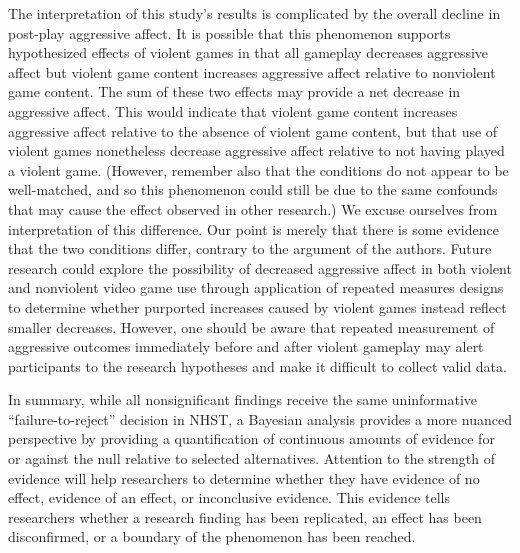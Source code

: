 \documentclass[man]{apa6}
\begin{document}
The interpretation of this study's results is complicated by the overall decline in post-play aggressive affect. It is possible that this phenomenon supports hypothesized effects of violent games in that all gameplay decreases aggressive affect but violent game content increases aggressive affect relative to nonviolent game content. The sum of these two effects may provide a net decrease in aggressive affect. This would indicate that violent game content increases aggressive affect relative to the absence of violent game content, but that use of violent games nonetheless decrease aggressive affect relative to not having played a violent game. (However, remember also that the conditions do not appear to be well-matched, and so this phenomenon could still be due to the same confounds that may cause the effect observed in other research.) We excuse ourselves from interpretation of this difference. Our point is merely that there is some evidence that the two conditions differ, contrary to the argument of the authors. Future research could explore the possibility of decreased aggressive affect in both violent and nonviolent video game use through application of repeated measures designs to determine whether purported increases caused by violent games instead reflect smaller decreases. However, one should be aware that repeated measurement of aggressive outcomes immediately before and after violent gameplay may alert participants to the research hypotheses and make it difficult to collect valid data. 

In summary, while all nonsignificant findings receive the same uninformative ``failure-to-reject'' decision in NHST, a Bayesian analysis provides a more nuanced perspective by providing a quantification of continuous amounts of evidence for or against the null relative to selected alternatives. Attention to the strength of evidence will help researchers to determine whether they have evidence of no effect, evidence of an effect, or inconclusive evidence. This evidence tells researchers whether a research finding has been replicated, an effect has been disconfirmed, or a boundary of the phenomenon has been reached.
\end{document}
